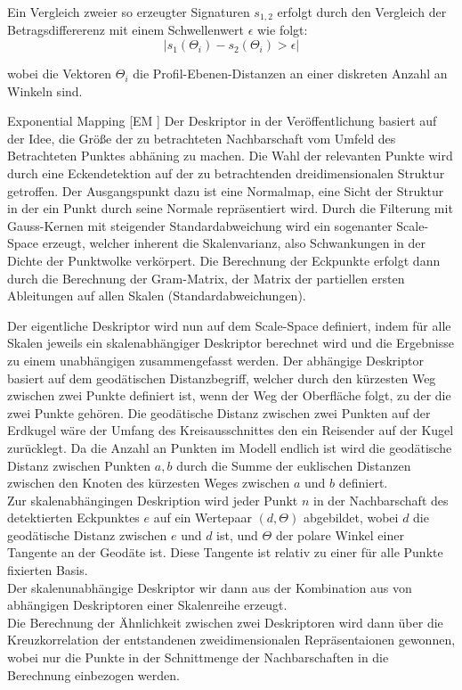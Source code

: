 \documentclass[12pt]{article}
\begin{document}
{	Ein Vergleich zweier so erzeugter Signaturen $s_{1,2}$ erfolgt durch den Vergleich der Betragsdiffererenz mit einem Schwellenwert $\epsilon$ wie folgt: \\

	$$|s_1(\Theta_i)-s_2(\Theta_i) > \epsilon|$$

	wobei die Vektoren $\Theta_i$ die Profil-Ebenen-Distanzen an einer diskreten Anzahl an Winkeln sind. 

	\item[Exponential Mapping [EM] \cite{em}]\label{EM} Der Deskriptor in der Veröffentlichung basiert auf der Idee, die Größe der zu betrachteten Nachbarschaft vom Umfeld des Betrachteten Punktes abhäning zu machen. Die Wahl der relevanten Punkte wird durch eine Eckendetektion auf der zu betrachtenden dreidimensionalen Struktur getroffen. Der Ausgangspunkt dazu ist eine Normalmap, eine Sicht der Struktur in der ein Punkt durch seine Normale repräsentiert wird. Durch die Filterung mit Gauss-Kernen mit steigender Standardabweichung wird ein sogenanter Scale-Space erzeugt, welcher inherent die Skalenvarianz, also Schwankungen in der Dichte der Punktwolke verkörpert. Die Berechnung der Eckpunkte erfolgt dann durch die Berechnung der Gram-Matrix, der Matrix der partiellen ersten Ableitungen auf allen Skalen (Standardabweichungen).

	Der eigentliche Deskriptor wird nun auf dem Scale-Space definiert, indem für alle Skalen jeweils ein skalenabhängiger Deskriptor berechnet wird und die Ergebnisse zu einem unabhängigen zusammengefasst werden. Der abhängige Deskriptor basiert auf dem geodätischen Distanzbegriff, welcher durch den kürzesten Weg zwischen zwei Punkte definiert ist, wenn der Weg der Oberfläche folgt, zu der die zwei Punkte gehören. Die geodätische Distanz zwischen zwei Punkten auf der Erdkugel wäre der Umfang des Kreisausschnittes den ein Reisender auf der Kugel zurücklegt. Da die Anzahl an Punkten im Modell endlich ist wird die geodätische Distanz zwischen Punkten $a,b$ durch die Summe der euklischen Distanzen zwischen den Knoten des kürzesten Weges zwischen $a$ und $b$ definiert. \\

Zur skalenabhängingen Deskription wird jeder Punkt $n$ in der Nachbarschaft des detektierten Eckpunktes $e$ auf ein Wertepaar $(d,\Theta)$ abgebildet, wobei $d$ die geodätische Distanz zwischen $e$ und $d$ ist, und $\Theta$ der polare Winkel einer Tangente an der Geodäte ist. Diese Tangente ist relativ zu einer für alle Punkte fixierten Basis.\\

Der skalenunabhängige Deskriptor wir dann aus der Kombination aus von abhängigen Deskriptoren einer Skalenreihe erzeugt.\\
Die Berechnung der Ähnlichkeit zwischen zwei Deskriptoren wird dann über die Kreuzkorrelation der entstandenen zweidimensionalen Repräsentaionen gewonnen, wobei nur die Punkte in der Schnittmenge der Nachbarschaften in die Berechnung einbezogen werden.

}
\end{document}
